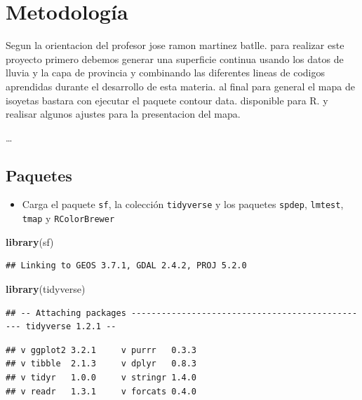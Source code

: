 \documentclass[11pt,]{article}
\newenvironment{Shaded}{\begin{snugshade}}{\end{snugshade}}
\newcommand{\KeywordTok}[1]{\textcolor[rgb]{0.13,0.29,0.53}{\textbf{#1}}}
\newcommand{\NormalTok}[1]{#1}
\providecommand{\tightlist}{%
\setlength{\itemsep}{0pt}\setlength{\parskip}{0pt}}
\begin{document}
\section{Metodología}\label{metodologuxeda}

Segun la orientacion del profesor jose ramon martinez batlle. para
realizar este proyecto primero debemos generar una superficie continua
usando los datos de lluvia y la capa de provincia y combinando las
diferentes lineas de codigos aprendidas durante el desarrollo de esta
materia. al final para general el mapa de isoyetas bastara con ejecutar
el paquete contour data. disponible para R. y realisar algunos ajustes
para la presentacion del mapa.

\ldots

\subsection{Paquetes}\label{paquetes}

\begin{itemize}
\tightlist
\item
  Carga el paquete \texttt{sf}, la colección \texttt{tidyverse} y los
  paquetes \texttt{spdep}, \texttt{lmtest}, \texttt{tmap} y
  \texttt{RColorBrewer}
\end{itemize}

\begin{Shaded}
\begin{Highlighting}[]
\KeywordTok{library}\NormalTok{(sf)}
\end{Highlighting}
\end{Shaded}

\begin{verbatim}
## Linking to GEOS 3.7.1, GDAL 2.4.2, PROJ 5.2.0
\end{verbatim}

\begin{Shaded}
\begin{Highlighting}[]
\KeywordTok{library}\NormalTok{(tidyverse)}
\end{Highlighting}
\end{Shaded}

\begin{verbatim}
## -- Attaching packages ------------------------------------------------ tidyverse 1.2.1 --
\end{verbatim}

\begin{verbatim}
## v ggplot2 3.2.1     v purrr   0.3.3
## v tibble  2.1.3     v dplyr   0.8.3
## v tidyr   1.0.0     v stringr 1.4.0
## v readr   1.3.1     v forcats 0.4.0
\end{verbatim}
\end{document}
